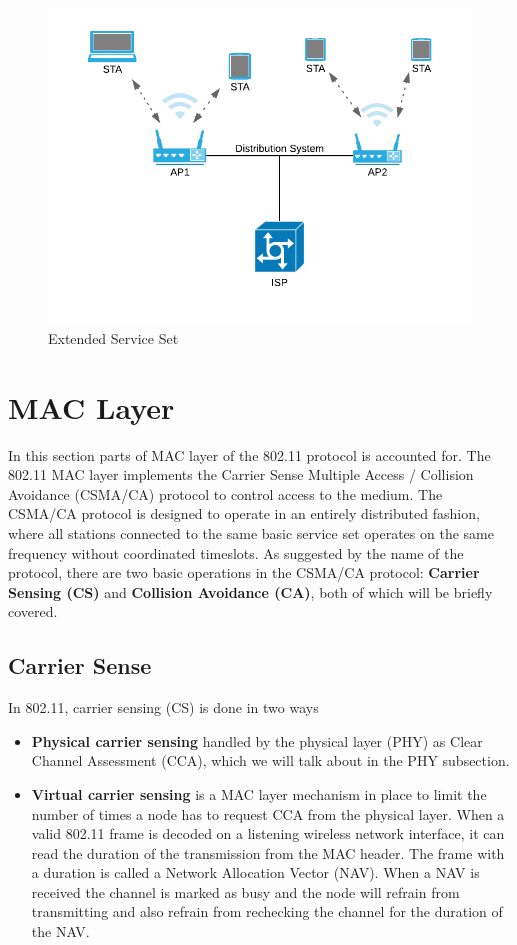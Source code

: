 		 \begin{figure}
			 \center
			 \includegraphics[scale=1]{Images/ESS.png}
			 \caption{Extended Service Set}
			 \label{fig:extendedserviceset}
		 \end{figure}


     \section{MAC Layer}
		 In this section parts of MAC layer of the 802.11 protocol is accounted for.  
     The 802.11 MAC layer implements the Carrier Sense Multiple Access / Collision Avoidance (CSMA/CA) protocol to control access to the medium.
     The CSMA/CA protocol is designed to operate in an entirely distributed fashion, where all stations connected to the same basic service set operates on
     the same frequency without coordinated timeslots. As suggested by the name of the protocol, there are two basic operations in the CSMA/CA protocol:
     \textbf{Carrier Sensing (CS)} and \textbf{Collision Avoidance (CA)}, both of which will be briefly covered.  

     \subsection{Carrier Sense}
     In 802.11, carrier sensing (CS) is done in two ways
     \begin{itemize}
     \item \textbf{Physical carrier sensing} handled by the physical layer (PHY) as Clear Channel Assessment (CCA), which we will talk about in the PHY subsection.
     \item \textbf{Virtual carrier sensing} is a MAC layer mechanism in place to limit the number of times
     a node has to request CCA from the physical layer. When a valid 802.11 frame is decoded on a listening wireless network interface, it can read the duration of
     the transmission from the MAC header. The frame with a duration is called a Network Allocation Vector (NAV). When a NAV is received 
     the channel is marked as busy and the node will refrain from transmitting and also refrain from rechecking the channel for the duration of the NAV. 
     \end{itemize} 


